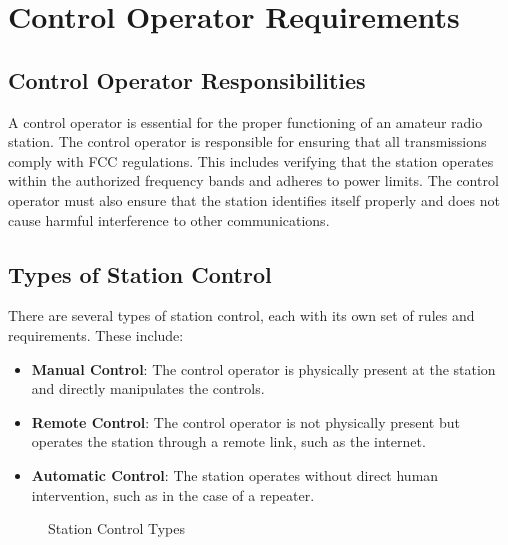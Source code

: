 \section{Control Operator Requirements}
\label{sec:control_op}

\subsection*{Control Operator Responsibilities}
A control operator is essential for the proper functioning of an amateur radio station. The control operator is responsible for ensuring that all transmissions comply with FCC regulations. This includes verifying that the station operates within the authorized frequency bands and adheres to power limits. The control operator must also ensure that the station identifies itself properly and does not cause harmful interference to other communications.

\subsection*{Types of Station Control}
There are several types of station control, each with its own set of rules and requirements. These include:

\begin{itemize}
    \item \textbf{Manual Control}: The control operator is physically present at the station and directly manipulates the controls.
    \item \textbf{Remote Control}: The control operator is not physically present but operates the station through a remote link, such as the internet.
    \item \textbf{Automatic Control}: The station operates without direct human intervention, such as in the case of a repeater.
\end{itemize}

\begin{figure}[htbp]
    \centering
    \caption{Station Control Types}
    \label{fig:control_types}
\end{figure}

